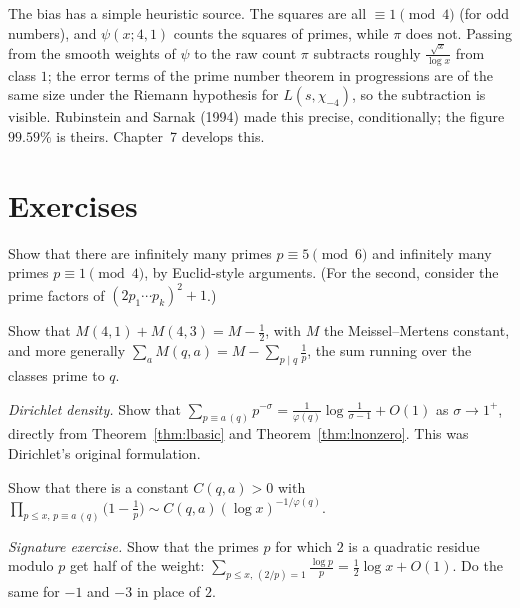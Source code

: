 \begin{remark}
The bias has a simple heuristic source. The squares are all $\equiv1\pmod4$ (for odd numbers), and $\psi(x;4,1)$ counts the squares of primes,
while $\pi$ does not. Passing from the smooth weights of $\psi$ to the raw count $\pi$ subtracts roughly $\frac{\sqrt x}{\log x}$ from class $1$; the error terms
of the prime number theorem in progressions are of the same size under the Riemann hypothesis for $L(s,\chi_{-4})$, so the subtraction is
visible. Rubinstein and Sarnak (1994) made this precise, conditionally; the figure $99.59\%$ is theirs. Chapter~7 develops this.
\end{remark}

\section{Exercises}

\begin{exercise}[$\star$]\label{ex:euclid}
Show that there are infinitely many primes $p\equiv5\pmod6$ and infinitely many primes $p\equiv1\pmod4$, by Euclid-style arguments.
(For the second, consider the prime factors of $(2p_1\cdots p_k)^2+1$.)
\end{exercise}

\begin{exercise}[$\star$]\label{ex:constmod4}
Show that $M(4,1)+M(4,3)=M-\frac12$, with $M$ the Meissel--Mertens constant, and more generally $\sum_{a}M(q,a)=M-\sum_{p\mid q}\frac1p$, the sum
running over the classes prime to $q$.
\end{exercise}

\begin{exercise}[$\star\star$]\label{ex:density}
\emph{Dirichlet density.} Show that $\sum_{p\equiv a\,(q)}p^{-\sigma}=\frac1{\varphi(q)}\log\frac1{\sigma-1}+O(1)$ as $\sigma\to1^+$, directly from Theorem~\ref{thm:lbasic} and
Theorem~\ref{thm:lnonzero}. This was Dirichlet's original formulation.
\end{exercise}

\begin{exercise}[$\star\star$]\label{ex:progproduct}
Show that there is a constant $C(q,a)>0$ with $\prod_{p\le x,\,p\equiv a\,(q)}\bigl(1-\frac1p\bigr)\sim C(q,a)(\log x)^{-1/\varphi(q)}$.
\end{exercise}

\begin{exercise}[$\star\star$]\label{ex:two}
\emph{Signature exercise.} Show that the primes $p$ for which $2$ is a quadratic residue modulo $p$ get half of the weight:
$\sum_{p\le x,\,(2/p)=1}\frac{\log p}p=\frac12\log x+O(1)$. Do the same for $-1$ and $-3$ in place of $2$.
\end{exercise}

